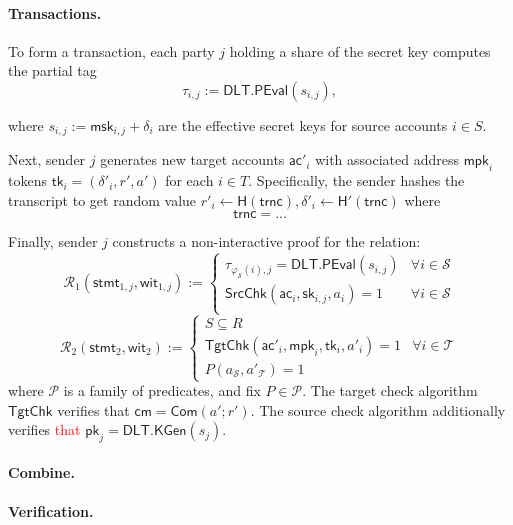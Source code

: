 \paragraph{Transactions.}
To form a transaction, each party $j$ holding a share of the secret key computes the partial tag
    \[
        \tau_{i,j} := \mathsf{DLT.PEval}(s_{i,j}),
    \]
   
where $s_{i,j} := \mathsf{msk}_{i,j} + \delta_i$ are the effective secret keys for source accounts $i \in S$. 

Next, sender $j$ generates new target accounts $\mathsf{ac}'_i$ with associated address $\mathsf{mpk}_i$ tokens $\mathsf{tk}_i= (\delta'_i, r', a')$ for each $i \in T$. Specifically, the sender hashes the transcript to get random value $r'_i \leftarrow \mathsf{H(trnc)},\delta'_i \leftarrow \mathsf{H'(trnc)}$ where
\[
\mathsf{trnc}=...
\]


Finally, sender $j$ constructs a non-interactive proof for the relation:
\[
\mathcal{R}_1(\mathsf{stmt}_{1,j}, \mathsf{wit}_{1,j}) := 
\begin{cases}
\tau_{\varphi_{\mathcal{S}}(i),j} = \mathsf{DLT.PEval}(s_{i,j}) & \forall i \in \mathcal{S} \\[4pt]
\mathsf{SrcChk}(\mathsf{ac}_i, \mathsf{sk}_{i,j}, a_i) = 1 & \forall i \in \mathcal{S} \\[4pt]
\end{cases}
\]
\[
\mathcal{R}_2(\mathsf{stmt}_{2}, \mathsf{wit}_{2}) := 
\begin{cases}
S \subseteq R \\[4pt]
\mathsf{TgtChk}(\mathsf{ac}'_i, \mathsf{mpk}_i, \mathsf{tk}_i, a'_i) = 1 & \forall i \in \mathcal{T} \\[4pt]
P(a_{\mathcal{S}}, a'_{\mathcal{T}}) = 1
\end{cases}
\]
where $\mathcal{P}$ is a family of predicates, and fix $P \in \mathcal{P}$. The target check algorithm $\mathsf{TgtChk}$ verifies that $\mathsf{cm} = \mathsf{Com}(a'; r')$. The {source check algorithm} additionally verifies \textcolor{red}{that} $\mathsf{pk}_j = \mathsf{DLT.KGen}(s_j)$.

\paragraph{Combine.}

\paragraph{Verification.}



